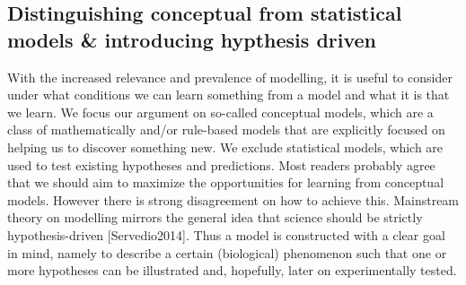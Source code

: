 \subsection{Distinguishing conceptual from statistical models & introducing hypthesis driven}

With the increased relevance and prevalence of modelling, it is useful to consider under what conditions we can learn something from a model and what it is that we learn. We focus our argument on so-called conceptual models, which are a class of mathematically and/or rule-based models that are explicitly focused on helping us to discover something new. We exclude statistical models, which are used to test existing hypotheses and predictions. Most readers probably agree that we should aim to maximize the opportunities for learning from conceptual models. However there is strong disagreement on how to achieve this. Mainstream theory on modelling mirrors the general idea that science should be strictly hypothesis-driven [Servedio2014]. Thus a model is constructed with a clear goal in mind, namely to describe a certain (biological) phenomenon such that one or more hypotheses can be illustrated and, hopefully, later on experimentally tested.
